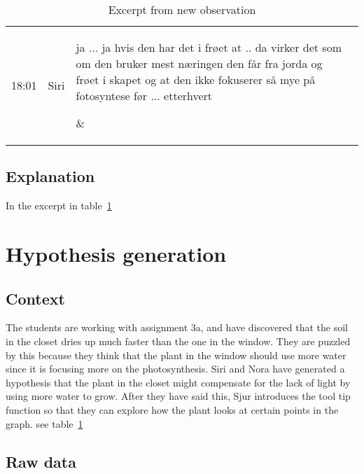 \begin{table}[H]
\begin{adjustwidth}{-4em}{-4em}
\begin{center}
\begin{tabular}{r l p{9cm} p{4cm} }
	18:01 %
	&Siri %
	&\parbox[t]{9cm}{\raggedright ja ... ja hvis den har det i frøet at .. da virker det som om den bruker mest næringen den får fra jorda og frøet i skapet og at den ikke fokuserer så mye på fotosyntese før ... etterhvert %
	}&\parbox[t]{4cm}{\raggedright  %
	}\\


	\bottomrule
\end{tabular}
\end{center}
\end{adjustwidth}
\caption{Excerpt from new observation}
\label{excerpt:observation1}
\end{table}

\subsection{Explanation}
In the excerpt in table~\ref{excerpt:observation1} 


\section{Hypothesis generation}

\subsection{Context}
The students are working with assignment 3a, and have discovered that the soil in the closet dries up much faster than the one in the window. They are puzzled by this because they think that the plant in the window should use more water since it is focusing more on the photosynthesis. Siri and Nora have generated a hypothesis that the plant in the closet might compensate for the lack of light by using more water to grow. After they have said this, Sjur introduces the tool tip function so that they can explore how the plant looks at certain points in the graph.  see table~\ref{excerpt:observation1} 

\subsection{Raw data}

